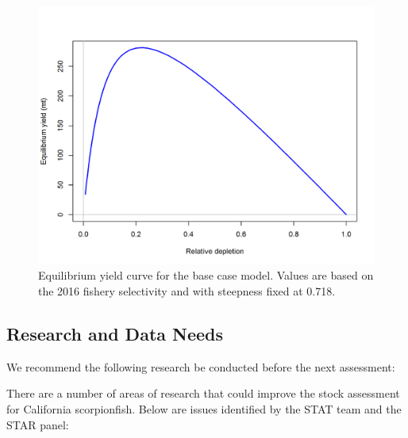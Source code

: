 \documentclass[12pt,]{article}
\begin{document}
\begin{figure}[htbp]
\centering
\includegraphics{r4ss/plots_mod1/yield1_yield_curve.png}
\caption{Equilibrium yield curve for the base case model. Values are
based on the 2016 fishery selectivity and with steepness fixed at 0.718.
\label{fig:Yield_all}}
\end{figure}

\FloatBarrier

\newpage

\subsection*{Research and Data Needs}\label{research-and-data-needs}

We recommend the following research be conducted before the next
assessment:

There are a number of areas of research that could improve the stock
assessment for California scorpionfish. Below are issues identified by
the STAT team and the STAR panel:
\end{document}
